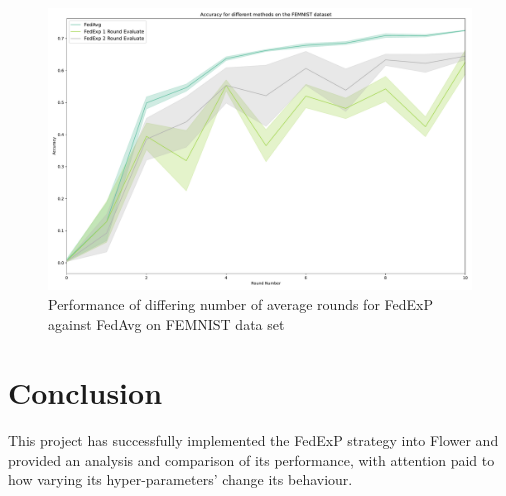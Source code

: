 \documentclass{article}
\begin{document}
\begin{figure}
    \centerline{\includegraphics[width=.6\linewidth]{figs/femnist_fedexp_fedavg_evaluateRounds.pdf}}
    \caption{Performance of differing number of average rounds for FedExP against FedAvg on FEMNIST data set}
    \label{fig:femnistDifferentNumberOfEvaluateRounds}
\end{figure}

\section{Conclusion}

This project has successfully implemented the FedExP strategy into Flower and provided an analysis and comparison of its performance, with attention paid to how varying its hyper-parameters' change its behaviour.


\end{document}

